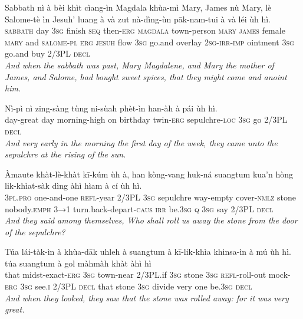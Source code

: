 \documentclass[11pt,a4paper]{article}
\begin{document}
\begin{exe}
\gll Sabbath nì à bèi khìt cìang-ìn Magdala khùa-mì Mary, James nù Mary, lè Salome-tè ìn Jesuh' luang à và zut nà-dìng-ùn pāk-nam-tui à và léi ùh hì. \\
     \textsc{sabbath} day \textsc{3sg} finish \textsc{seq} then-\textsc{erg} \textsc{magdala} town-person \textsc{mary} \textsc{james} female \textsc{mary} and \textsc{salome}-\textsc{pl} \textsc{erg} \textsc{jesuh} flow \textsc{3sg} go.and overlay \textsc{2sg}-\textsc{irr}-\textsc{imp} ointment \textsc{3sg} go.and buy 2/3PL \textsc{decl} \\
\glt \textcolor{kjvcolor}{\textit{And when the sabbath was past, Mary Magdalene, and Mary the mother of James, and Salome, had bought sweet spices, that they might come and anoint him.}}

\gll Nì-pì nì zing-sàng tùng ni-sùah phèt-ìn han-àh à pái ùh hì. \\
     day-great day morning-high on birthday twin-\textsc{erg} sepulchre-\textsc{loc} \textsc{3sg} go 2/3PL \textsc{decl} \\
\glt \textcolor{kjvcolor}{\textit{And very early in the morning the first day of the week, they came unto the sepulchre at the rising of the sun.}}

\gll Àmaute khàt-lè-khàt kī-kúm ùh à, han kòng-vang huk-ná suangtum kua'n hòng lik-khìat-sàk dìng àhì hìam à cí ùh hì. \\
     \textsc{3pl}.\textsc{pro} one-and-one \textsc{refl}-year 2/3PL \textsc{3sg} sepulchre way-empty cover-\textsc{nmlz} stone nobody.\textsc{emph} \textsc{3→1} turn.back-depart-\textsc{caus} \textsc{irr} be.\textsc{3sg} \textsc{q} \textsc{3sg} say 2/3PL \textsc{decl} \\
\glt \textcolor{kjvcolor}{\textit{And they said among themselves, Who shall roll us away the stone from the door of the sepulchre?}}

\gll Túa lái-tàk-ìn à khùa-dāk uhleh à suangtum à kī-lik-khìa khinsa-ìn à mú ùh hì. túa suangtum à gol màhmàh khàt àhì hì \\
     that midst-exact-\textsc{erg} \textsc{3sg} town-near 2/3PL.if \textsc{3sg} stone \textsc{3sg} \textsc{refl}-roll-out mock-\textsc{erg} \textsc{3sg} see.\textsc{i} 2/3PL \textsc{decl} that stone \textsc{3sg} divide very one be.\textsc{3sg} \textsc{decl} \\
\glt \textcolor{kjvcolor}{\textit{And when they looked, they saw that the stone was rolled away: for it was very great.}}


\end{exe}
\end{document}
